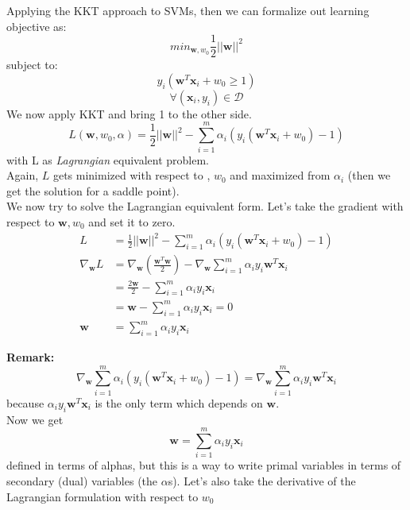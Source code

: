             Applying the KKT approach to SVMs, then we can formalize out learning objective as:
            $$min_{\pmb{w}, w_0} \frac{1}{2} ||\pmb{w}||^2$$
            subject to:
            $$y_i(\pmb{w}^T \pmb{x}_i + w_0 \geq 1)$$
            $$\forall (\pmb{x}_i, y_i) \in \mathcal{D}$$
            We now apply KKT and bring 1 to the other side. 
            \begin{equation}
                L(\pmb{w},  w_0, \alpha) = \frac{1}{2} ||\pmb{w}||^2 - 
                \sum_{i=1}^m \alpha_i (y_i (\pmb{w}^T \pmb{x}_i + w_0) - 1)
                \label{eq:Lagrangian}
            \end{equation}
            with L as \textit{Lagrangian} equivalent problem.\\
            Again, $L$ gets minimized with respect to , $w_0$ and maximized from $\alpha_i$ (then we get the solution for a saddle point).\\

            We now try to solve the Lagrangian equivalent form. Let's take the gradient with respect to $\pmb{w}, w_0$ and set it to zero. 
            \begin{align*}
                L &= \frac{1}{2} ||\pmb{w}||^2 - 
                \sum_{i=1}^m \alpha_i (y_i (\pmb{w}^T \pmb{x}_i + w_0) - 1)\\
                \nabla_{\pmb{w}} L &=  \nabla_{\pmb{w}} \left (\frac{\pmb{w}^T \pmb{w}}{2} \right) - \nabla_{\pmb{w}}\sum_{i=1}^m \alpha_i y_i \pmb{w}^T \pmb{x}_i\\
                &= \frac{2\pmb{w}}{2} - \sum_{i=1}^m \alpha_i y_i \pmb{x}_i \\
                &=\pmb{w} - \sum_{i=1}^m \alpha_i y_i \pmb{x}_i = 0\\
                \pmb{w} &=  \sum_{i=1}^m \alpha_i y_i \pmb{x}_i
            \end{align*}

            \textbf{Remark:}
            $$\nabla_{\pmb{w}} \sum_{i=1}^m \alpha_i (y_i (\pmb{w}^T \pmb{x}_i + w_0) - 1) = \nabla_{\pmb{w}}\sum_{i=1}^m \alpha_i y_i \pmb{w}^T \pmb{x}_i$$ because $\alpha_i y_i \pmb{w}^T \pmb{x}_i$ is the only term which depends on $\pmb{w}$. \\
            
            Now we get 
            \begin{equation}
                \pmb{w} =  \sum_{i=1}^m \alpha_i y_i \pmb{x}_i
                \label{ref:important_intermediate_result}    
            \end{equation}
            defined in terms of alphas, but this is a way to write primal variables in terms of secondary (dual) variables (the $\alpha$s). 
            Let's also take the derivative of the Lagrangian formulation with respect to $w_0$


